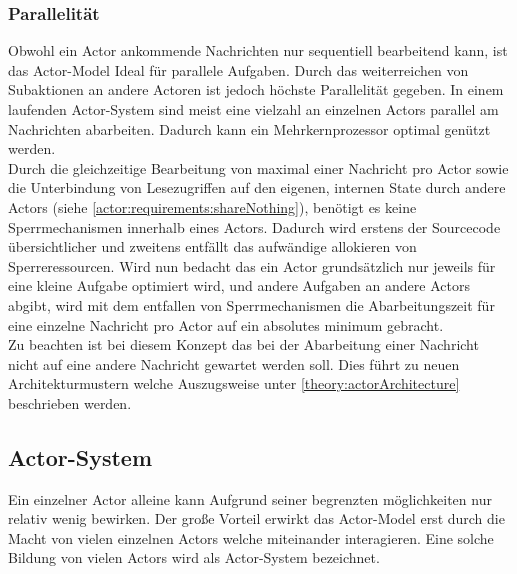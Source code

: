 \subsubsection{Parallelität}\label{actor:parallelism}
Obwohl ein Actor ankommende Nachrichten nur sequentiell bearbeitend kann, ist das Actor-Model Ideal für parallele Aufgaben.\citep{hewitt1973session} Durch das weiterreichen von Subaktionen an andere Actoren ist jedoch höchste Parallelität gegeben. In einem laufenden Actor-System sind meist eine vielzahl an einzelnen Actors parallel am Nachrichten abarbeiten. Dadurch kann ein Mehrkernprozessor optimal genützt werden. \citep{Agha1985ActorsSystems} \\
Durch die gleichzeitige Bearbeitung von maximal einer Nachricht pro Actor sowie die Unterbindung von Lesezugriffen auf den eigenen, internen State durch andere Actors (siehe \ref{actor:requirements:shareNothing}), benötigt es keine Sperrmechanismen innerhalb eines Actors. Dadurch wird erstens der Sourcecode übersichtlicher und zweitens entfällt das aufwändige allokieren von Sperreressourcen.\citep{Vernon2015ReactiveAkka}
Wird nun bedacht das ein Actor grundsätzlich nur jeweils für eine kleine Aufgabe optimiert wird, und andere Aufgaben an andere Actors abgibt, wird mit dem entfallen von Sperrmechanismen die Abarbeitungszeit für eine einzelne Nachricht pro Actor auf ein absolutes minimum gebracht. \citep{Vernon2015ReactiveAkka} \\
Zu beachten ist bei diesem Konzept das bei der Abarbeitung einer Nachricht nicht auf eine andere Nachricht gewartet werden soll. Dies führt zu neuen Architekturmustern welche Auszugsweise unter \ref{theory:actorArchitecture} beschrieben werden.

\subsection{Actor-System}
Ein einzelner Actor alleine kann Aufgrund seiner begrenzten möglichkeiten nur relativ wenig bewirken. Der große Vorteil erwirkt das Actor-Model erst durch die Macht von vielen einzelnen Actors welche miteinander interagieren. Eine solche Bildung von vielen Actors wird als Actor-System bezeichnet.\citep{Agha1985ActorsSystems}
